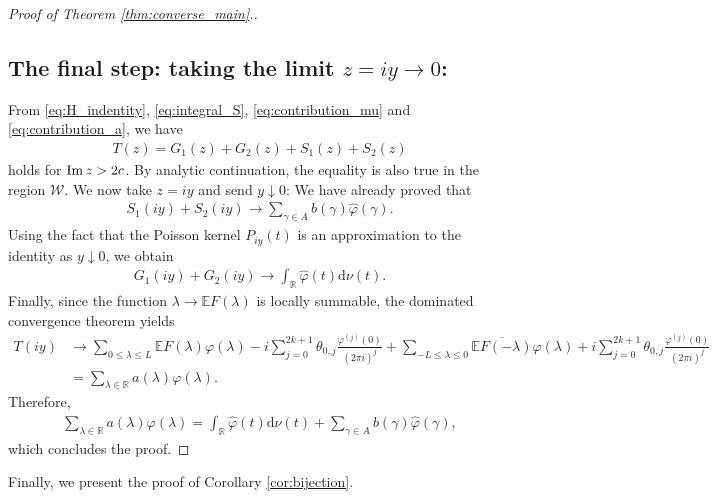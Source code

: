 \documentclass[a4paper,reqno,12pt]{amsart}
\newcommand{\W}{\mathcal{W}}
\renewcommand{\r}{\mathbb{R}}
\newcommand{\ft}{\widehat}
\newcommand{\la}{\lambda}
\newcommand{\ga}{\gamma}
\newcommand{\p}{\varphi}
\renewcommand{\d}{\mathrm{d}}
\newcommand{\ov}[1]{\overline{#1}}
\newcommand{\1}{{\bf 1}}
\newcommand{\ra}{\rightarrow}
\newcommand{\e}{\mathbb{E}}
\renewcommand{\Im}{{\rm Im}\,}
\begin{document}
\begin{proof}[Proof of Theorem \ref{thm:converse_main}.]
\subsection*{The final step: taking the limit $z=iy\ra0$:} From \eqref{eq:H_indentity}, \eqref{eq:integral_S}, \eqref{eq:contribution_mu} and \eqref{eq:contribution_a}, we have
\begin{align*}
    T(z)=G_1(z)+G_2(z)+S_1(z)+S_2(z)
\end{align*}
holds for $\Im{z}>2c$. By analytic continuation, the equality is also true in the region $\W$. We now take $z=iy$ and send $y\downarrow0$: We have already proved that
\begin{align*}
    S_1(iy)+S_2(iy)\ra \sum_{\ga\in A} b(\ga)\ft{\p}(\ga).
\end{align*}
Using the fact that the Poisson kernel $P_{iy}(t)$ is an approximation to the identity as $y\downarrow0$, we obtain
\begin{align*}
    G_1(iy)+G_2(iy)\ra \int_{\r} \ft{\p}(t) \d\nu(t). 
\end{align*}
Finally, since the function $\la\ra\e F(\la)$ is locally summable, the dominated convergence theorem yields
\begin{align*}
    T(iy)&\ra \sum_{0\leq\la\leq L} \e F(\la)\p(\la)-i\sum_{j=0}^{2k+1} \theta_{0,j} \frac{\p^{(j)}(0)}{(2\pi i)^j}+\sum_{-L\leq\la\leq 0} \ov{\e F(-\la)}\p(\la)+i\sum_{j=0}^{2k+1} \theta_{0,j} \frac{\p^{(j)}(0)}{(2\pi i)^j}\\
    &=\sum_{\la\in\r} a(\la)\p(\la).
\end{align*}
Therefore,
\begin{align*}
    \sum_{\la\in\r} a(\la)\p(\la)=\int_{\r} \ft{\p}(t) \d\nu(t)+\sum_{\ga\in A} b(\ga)\ft{\p}(\ga),
\end{align*}
which concludes the proof.
\end{proof}
Finally, we present the proof of Corollary \ref{cor:bijection}.
\end{document}
